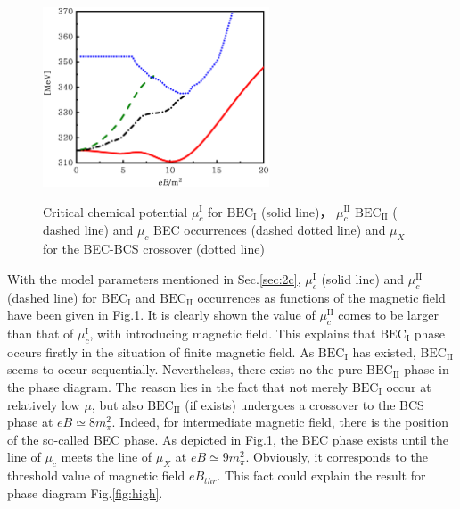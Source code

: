 \documentclass[prd, showpacs,nofootinbib,amsmath,amssymb,12pt]{revtex4}
\begin{document}
\begin{figure}[h]
  \caption{Critical  chemical potential  $\mu_c^\text{I}$ for $\text{BEC}_\text{I}$ (solid line)，     $\mu_c^\text{II}$  $\text{BEC}_\text{II}$ ( dashed line)   and  $\mu_c$ BEC occurrences (dashed dotted line)  and $\mu_X$ for the BEC-BCS crossover (dotted line)}
  \centering
    \includegraphics[width=0.6\textwidth]{3.eps}
    \label{fig:thirdpoint}
\end{figure}
With the model parameters mentioned in Sec.\ref{sec:2c},  $\mu_c^\text{I}$ (solid line) and $\mu_c^\text{II}$ (dashed line) for  $\text{BEC}_\text{I}$  and $\text{BEC}_\text{II}$  occurrences as  functions of the magnetic field have been given in Fig.\ref{fig:thirdpoint}.
It is clearly shown the value of $\mu_c^\text{II}$   comes to be larger than that of $\mu_c^\text{I}$, with introducing magnetic field.
This explains that $\text{BEC}_\text{I}$ phase occurs firstly in the situation of finite magnetic field.
As $\text{BEC}_\text{I}$ has existed,  $\text{BEC}_\text{II}$ seems to occur sequentially.
Nevertheless, there exist no the pure  $\text{BEC}_\text{II}$ phase in the phase diagram.
The reason lies in the fact that not merely $\text{BEC}_\text{I}$ occur at relatively low $\mu$, but also $\text{BEC}_\text{II}$ (if exists) undergoes a crossover to the BCS phase at $eB \simeq 8 m_\pi^2$.
Indeed, for intermediate magnetic field, there is the position of the so-called BEC phase.
As depicted in Fig.\ref{fig:thirdpoint}, 
the BEC phase exists until
 the line of $\mu_c$ meets the line of $\mu_X$ at $eB \simeq 9 m_\pi^2$.
Obviously, it   corresponds to the threshold value of magnetic field $eB_{thr}$. This fact could explain the 
result for phase diagram Fig.\ref{fig:high}.
\end{document}
